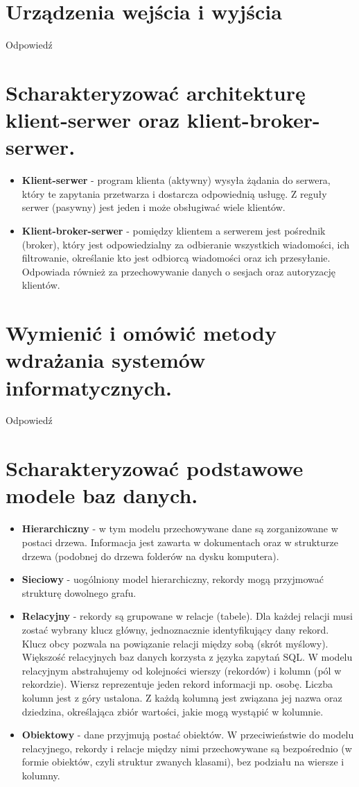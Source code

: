 \documentclass[12pt,a4paper]{article}
\begin{document}
	\section{Urządzenia wejścia i wyjścia}
	Odpowiedź

	\section{Scharakteryzować architekturę klient-serwer oraz klient-broker-serwer.}
	\begin{itemize}
		\item  \textbf{Klient-serwer} - program klienta (aktywny) wysyła żądania do serwera, który te zapytania przetwarza i dostarcza odpowiednią usługę. Z reguły serwer (pasywny) jest jeden i może obsługiwać wiele klientów.
		\item \textbf{Klient-broker-serwer} - pomiędzy klientem a serwerem jest pośrednik (broker), który jest odpowiedzialny za odbieranie wszystkich wiadomości, ich filtrowanie, określanie kto jest odbiorcą wiadomości oraz ich przesyłanie. Odpowiada również za przechowywanie danych o sesjach oraz autoryzację klientów.
	\end{itemize}

	\section{Wymienić i omówić metody wdrażania systemów informatycznych.}
	Odpowiedź

	\section{Scharakteryzować podstawowe modele baz danych.}
	\begin{itemize}
		\item  \textbf{Hierarchiczny} - w tym modelu przechowywane dane są zorganizowane w postaci drzewa. Informacja jest zawarta w dokumentach oraz w strukturze drzewa (podobnej do drzewa folderów na dysku komputera).
		\item  \textbf{Sieciowy} - uogólniony model hierarchiczny, rekordy mogą przyjmować strukturę dowolnego grafu.
		\item  \textbf{Relacyjny} - rekordy są grupowane w relacje (tabele). Dla każdej relacji musi zostać wybrany klucz główny, jednoznacznie identyfikujący dany rekord. Klucz obcy pozwala na powiązanie relacji między sobą (skrót myślowy). Większość relacyjnych baz danych korzysta z języka zapytań SQL. W modelu relacyjnym abstrahujemy od kolejności wierszy (rekordów) i kolumn (pól w rekordzie). Wiersz reprezentuje jeden rekord informacji np. osobę. Liczba kolumn jest z góry ustalona. Z każdą kolumną jest związana jej nazwa oraz dziedzina, określająca zbiór wartości, jakie mogą wystąpić w kolumnie.
		\item  \textbf{Obiektowy} - dane przyjmują postać obiektów. W przeciwieństwie do modelu relacyjnego, rekordy i relacje między nimi przechowywane są bezpośrednio (w formie obiektów, czyli struktur zwanych klasami), bez podziału na wiersze i kolumny.
	\end{itemize}
\end{document}
